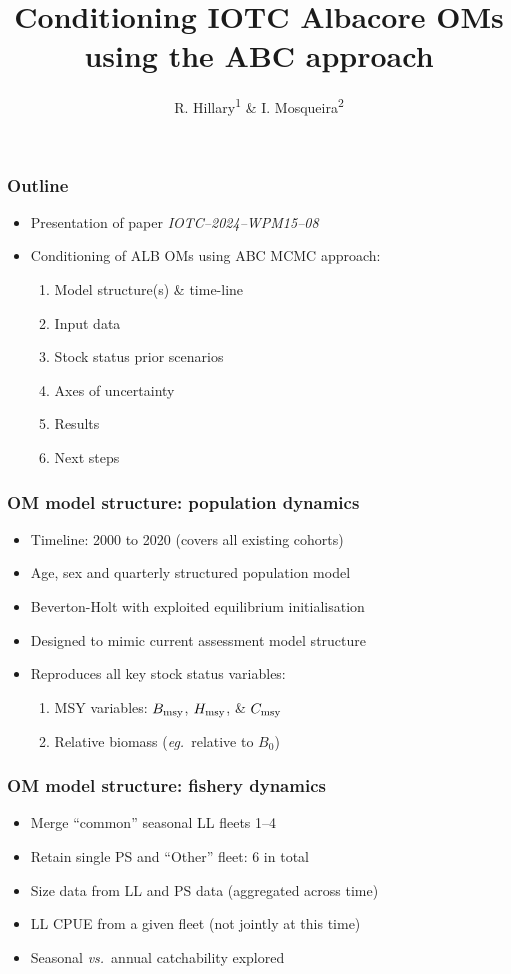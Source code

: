 \documentclass{beamer}
\title{Conditioning IOTC Albacore OMs using the ABC approach}
\author{R. Hillary\textsuperscript{1} \& I. Mosqueira\textsuperscript{2}}
\institute{\textsuperscript{1}CSIRO Environment \& \textsuperscript{2}University of Wageningen}
\newcommand{\bmsy}{B_{\rm msy}}
\newcommand{\cmsy}{C_{\rm msy}}
\newcommand{\hmsy}{H_{\rm msy}}
\newcommand{\vs}{\textit{vs.}~}
\newcommand{\eg}{\textit{eg.}~}
\begin{document}
\maketitle

\begin{frame}
\frametitle{Outline}
\begin{itemize}
    \item Presentation of paper \textit{IOTC--2024--WPM15--08}
    \item Conditioning of ALB OMs using ABC MCMC approach:
        \vspace{0.25cm} 
        \begin{enumerate}
            \item Model structure(s) \& time-line
            \item Input data
            \item Stock status prior scenarios
            \item Axes of uncertainty
            \item Results
            \item Next steps
        \end{enumerate}
\end{itemize}
\end{frame}

\begin{frame}
\frametitle{OM model structure: population dynamics}
\begin{itemize}
    \item Timeline: 2000 to 2020 (covers all existing cohorts)
    \item Age, sex and quarterly structured population model
    \item Beverton-Holt with exploited equilibrium initialisation
    \item Designed to mimic current assessment model structure
    \item Reproduces all key stock status variables:
        \vspace{0.25cm}
        \begin{enumerate}
            \item MSY variables: $\bmsy$, $\hmsy$, \& $\cmsy$
            \item Relative biomass (\eg relative to $B_0$)
        \end{enumerate}
\end{itemize}
\end{frame}

\begin{frame}
\frametitle{OM model structure: fishery dynamics}
\begin{itemize}
    \item Merge ``common'' seasonal LL fleets 1--4
    \item Retain single PS and ``Other'' fleet: 6 in total
    \item Size data from LL and PS data (aggregated across time)
    \item LL CPUE from a given fleet (not jointly at this time)
    \item Seasonal \vs annual catchability explored
\end{itemize}
\end{frame}
\end{document}

